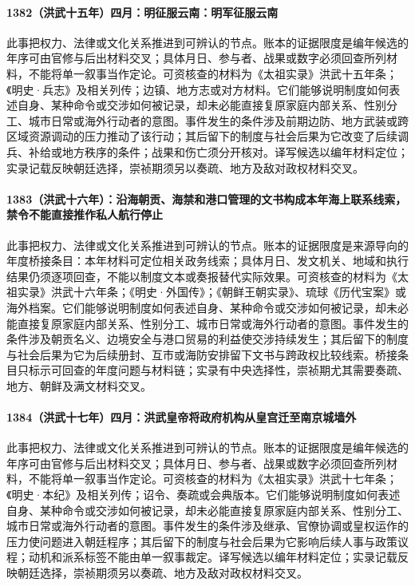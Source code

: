 \paragraph{1382（洪武十五年）四月：明征服云南：明军征服云南} 此事把权力、法律或文化关系推进到可辨认的节点。账本的证据限度是编年候选的年序可由官修与后出材料交叉；具体月日、参与者、战果或数字必须回查所列材料，不能将单一叙事当作定论。可资核查的材料为《太祖实录》洪武十五年条；《明史·兵志》及相关列传；边镇、地方志或对方材料。它们能够说明制度如何表述自身、某种命令或交涉如何被记录，却未必能直接复原家庭内部关系、性别分工、城市日常或海外行动者的意图。事件发生的条件涉及前期边防、地方武装或跨区域资源调动的压力推动了该行动；其后留下的制度与社会后果为它改变了后续调兵、补给或地方秩序的条件；战果和伤亡须分开核对。译写候选以编年材料定位；实录记载反映朝廷选择，崇祯期须另以奏疏、地方及敌对政权材料交叉。

\paragraph{1383（洪武十六年）：沿海朝贡、海禁和港口管理的文书构成本年海上联系线索，禁令不能直接推作私人航行停止} 此事把权力、法律或文化关系推进到可辨认的节点。账本的证据限度是来源导向的年度桥接条目：本年材料可定位相关政务线索；具体月日、发文机关、地域和执行结果仍须逐项回查，不能以制度文本或奏报替代实际效果。可资核查的材料为《太祖实录》洪武十六年条；《明史·外国传》；《朝鲜王朝实录》、琉球《历代宝案》或海外档案。它们能够说明制度如何表述自身、某种命令或交涉如何被记录，却未必能直接复原家庭内部关系、性别分工、城市日常或海外行动者的意图。事件发生的条件涉及朝贡名义、边境安全与港口贸易的利益使交涉持续发生；其后留下的制度与社会后果为它为后续册封、互市或海防安排留下文书与跨政权比较线索。桥接条目只标示可回查的年度问题与材料链；实录有中央选择性，崇祯期尤其需要奏疏、地方、朝鲜及满文材料交叉。

\paragraph{1384（洪武十七年）四月：洪武皇帝将政府机构从皇宫迁至南京城墙外} 此事把权力、法律或文化关系推进到可辨认的节点。账本的证据限度是编年候选的年序可由官修与后出材料交叉；具体月日、参与者、战果或数字必须回查所列材料，不能将单一叙事当作定论。可资核查的材料为《太祖实录》洪武十七年条；《明史·本纪》及相关列传；诏令、奏疏或会典版本。它们能够说明制度如何表述自身、某种命令或交涉如何被记录，却未必能直接复原家庭内部关系、性别分工、城市日常或海外行动者的意图。事件发生的条件涉及继承、官僚协调或皇权运作的压力使问题进入朝廷程序；其后留下的制度与社会后果为它影响后续人事与政策议程；动机和派系标签不能由单一叙事裁定。译写候选以编年材料定位；实录记载反映朝廷选择，崇祯期须另以奏疏、地方及敌对政权材料交叉。

